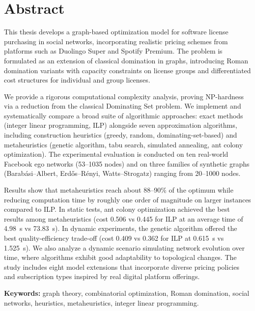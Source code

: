 \newpage
\section*{Abstract}

This thesis develops a graph-based optimization model for software license purchasing in social networks, incorporating realistic pricing schemes from platforms such as Duolingo Super and Spotify Premium. The problem is formulated as an extension of classical domination in graphs, introducing Roman domination variants with capacity constraints on license groups and differentiated cost structures for individual and group licenses.

We provide a rigorous computational complexity analysis, proving NP-hardness via a reduction from the classical Dominating Set problem. We implement and systematically compare a broad suite of algorithmic approaches: exact methods (integer linear programming, ILP) alongside seven approximation algorithms, including construction heuristics (greedy, random, dominating-set-based) and metaheuristics (genetic algorithm, tabu search, simulated annealing, ant colony optimization). The experimental evaluation is conducted on ten real-world Facebook ego networks (53--1035 nodes) and on three families of synthetic graphs (Barabási--Albert, Erdős--Rényi, Watts--Strogatz) ranging from 20--1000 nodes.

Results show that metaheuristics reach about 88--90\% of the optimum while reducing computation time by roughly one order of magnitude on larger instances compared to ILP. In static tests, ant colony optimization achieved the best results among metaheuristics (cost 0.506 vs 0.445 for ILP at an average time of 4.98~s vs 73.83~s). In dynamic experiments, the genetic algorithm offered the best quality-efficiency trade-off (cost 0.409 vs 0.362 for ILP at 0.615~s vs 1.525~s). We also analyze a dynamic scenario simulating network evolution over time, where algorithms exhibit good adaptability to topological changes. The study includes eight model extensions that incorporate diverse pricing policies and subscription types inspired by real digital platform offerings.

\textbf{Keywords:} graph theory, combinatorial optimization, Roman domination, social networks, heuristics, metaheuristics, integer linear programming.
